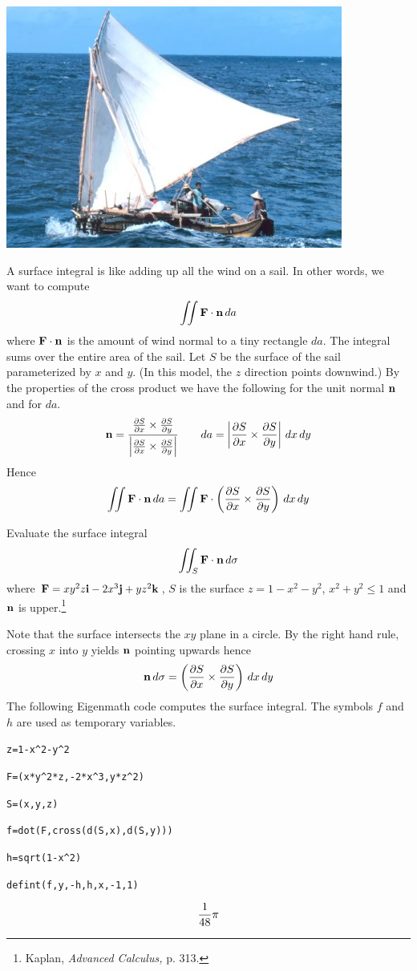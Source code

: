 
\newpage

\begin{center}
\noindent
\includegraphics[scale=0.5]{sailboat.png}
\end{center}

\bigskip
\noindent
A surface integral is like adding up all the wind on a sail.
In other words, we want to compute
$$\int\!\!\!\int{\bf F\cdot n}\,da$$
where ${\bf F\cdot n}$ is the amount of wind normal to a tiny rectangle $da$.
The integral sums over the entire area of the sail.
Let $S$ be the surface of the sail parameterized by $x$ and $y$.
(In this model, the $z$ direction points downwind.)
By the properties of the cross product we have the following for the unit normal $\bf n$
and for $da$.
$${\bf n}={ {{\partial S\over\partial x}\times{\partial S\over\partial y}}\over
 {\left|{\partial S\over\partial x}\times{\partial S\over\partial y}\right|}}\qquad
da=\left|{\partial S\over\partial x}\times{\partial S\over\partial y}\right|\,dx\,dy$$
Hence
$$\int\!\!\!\int{\bf F\cdot n}\,da=\int\!\!\!\int{\bf F}\cdot
\left({{\partial S\over\partial x}\times{\partial S\over\partial y}}\right)\,dx\,dy$$

\newpage

\noindent
Evaluate the surface integral
$$\int\!\!\!\int_S{\bf F\cdot n}\,d\sigma$$
where ${\bf F}=xy^2z{\bf i}-2x^3{\bf j}+yz^2{\bf k}$, $S$ is the surface
$z=1-x^2-y^2$, $x^2+y^2\le1$ and $\bf n$ is upper.\footnote{
Kaplan, {\it Advanced Calculus,} p. 313.}

\medskip
\noindent
Note that the surface intersects the $xy$ plane in a circle.
By the right hand rule, crossing $x$ into $y$ yields $\bf n$ pointing upwards hence
$${\bf n}\,d\sigma=\left({{\partial S\over\partial x}\times{\partial S\over\partial y}}\right)\,dx\,dy$$
The following Eigenmath code computes the surface integral.
The symbols $f$ and $h$ are used as temporary variables.

\medskip
\verb$z=1-x^2-y^2$

\verb$F=(x*y^2*z,-2*x^3,y*z^2)$

\verb$S=(x,y,z)$

\verb$f=dot(F,cross(d(S,x),d(S,y)))$

\verb$h=sqrt(1-x^2)$

\verb$defint(f,y,-h,h,x,-1,1)$

$${1\over48}\pi$$

